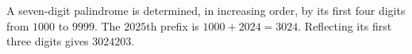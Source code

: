 A seven-digit palindrome is determined, in increasing order, by its first four digits from $1000$ to $9999$. The $2025$th prefix is $1000+2024=3024$. Reflecting its first three digits gives $\boxed{3024203}$.
